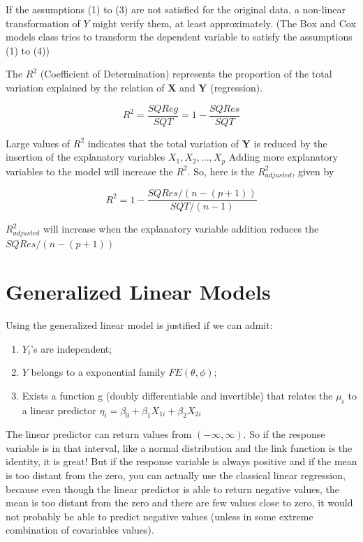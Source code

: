     If the assumptions (1) to (3) are not satisfied for the original data, a non-linear transformation of $Y$ might verify them, at least approximately.
    (The Box and Cox models class tries to transform the dependent variable to satisfy the assumptions (1) to (4))
    
    The $R^2$ (Coefficient of Determination) represents the proportion of the total variation explained by the relation of $\textbf{X}$ and $\textbf{Y}$ (regression).
    
    \begin{equation}
        R^2 = \frac{SQReg}{SQT} = 1 - \frac{SQRes}{SQT}
    \end{equation}
    
    Large values of $R^2$ indicates that the total variation of $\textbf{Y}$ is reduced by the insertion of the explanatory variables $X_1, X_2, \dots, X_p$
    Adding more explanatory variables to the model will increase the $R^2$. So, here is the $R^2_{adjusted}$, given by
    
    \begin{equation}
        R^2 = 1 - \frac{SQRes/(n-(p+1))}{SQT/(n-1)}
    \end{equation}
    
    $R^2_{adjusted}$ will increase when the explanatory variable addition reduces the $SQRes/(n-(p+1))$
    

\section{Generalized Linear Models}

Using the generalized linear model is justified if we can admit:
    
\begin{enumerate}
    \item $Y_i$'s are independent;
    \item $Y$ belongs to a exponential family $FE(\theta, \phi)$;
    \item Exists a function g (doubly differentiable and invertible) that relates the $\mu_i$ to a linear predictor $\eta_i = \beta_0 + \beta_1X_{1i} + \beta_2X_{2i}$
\end{enumerate}
    
The linear predictor can return values from $(-\infty, \infty)$. So if the response variable is in that interval, like a normal distribution and the link function is the identity, it is great! But if the response variable is always positive and if the mean is too distant from the zero, you can actually use the classical linear regression, because even though the linear predictor is able to return negative values, the mean is too distant from the zero and there are few values close to zero, it would not probably be able to predict negative values (unless in some extreme combination of covariables values).

